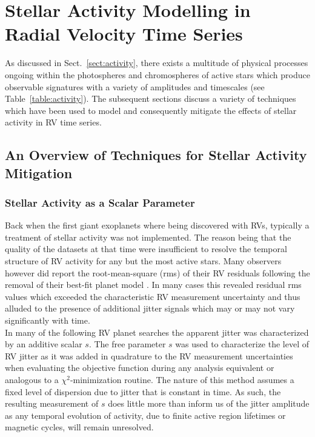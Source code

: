 \chapter{Stellar Activity Modelling in Radial Velocity Time Series}
As discussed in Sect.~\ref{sect:activity}, there exists a multitude of physical
processes ongoing within the photospheres and chromospheres of active stars
which produce observable signatures with a variety of amplitudes and timescales
(see Table~\ref{table:activity}). The subsequent sections discuss a variety of
techniques which have been used to model and consequently mitigate the effects of
stellar activity in RV time series.

\section{An Overview of Techniques for Stellar Activity Mitigation}
\label{sect:methods}

\subsection{Stellar Activity as a Scalar Parameter}
Back when the first giant exoplanets where being discovered with RVs,
typically a treatment of stellar activity was not implemented. The reason being
that the quality of the datasets at that time were insufficient to resolve the
temporal structure of RV activity for any but the most active stars. Many
observers however did report the root-mean-square (rms) of their RV residuals
following the removal of their best-fit planet model
\citep[e.g.][]{mayor95,butler96}. In
many cases this revealed residual rms values which exceeded the characteristic RV
measurement uncertainty and thus alluded to the presence of additional
jitter signals which may or may not vary significantly with time. \\

In many of the following RV planet searches the apparent jitter was characterized
by an additive scalar $s$. The free parameter $s$ was used to characterize the
level of RV jitter as it was added in quadrature to the RV measurement
uncertainties when evaluating the objective function during any analysis
equivalent or analogous to a $\chi^2$-minimization routine. The nature of this
method assumes a fixed level of dispersion due to jitter that is constant in time.
As such, the resulting
measurement of $s$ does little more than inform us of the jitter amplitude as
any temporal evolution of activity, due to finite active region lifetimes or magnetic
cycles, will remain unresolved.

